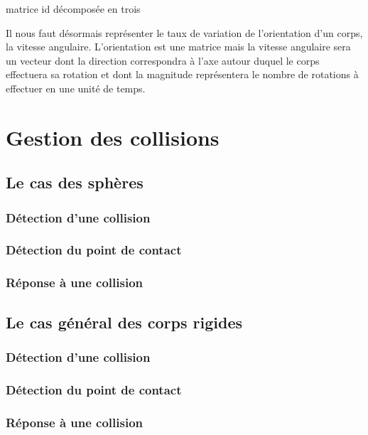 \documentclass[twocolumn]{article}
\begin{document}
matrice id décomposée en trois

Il nous faut désormais représenter le taux de variation de l'orientation d'un corps, la vitesse angulaire. L'orientation est une matrice mais la vitesse angulaire sera un vecteur dont la direction correspondra à l'axe autour duquel le corps effectuera sa rotation et dont la magnitude représentera le nombre de rotations à effectuer en une unité de temps.


\section{Gestion des collisions}

\subsection{Le cas des sphères}

\subsubsection{Détection d'une collision}

\subsubsection{Détection du point de contact}

\subsubsection{Réponse à une collision}

\subsection{Le cas général des corps rigides}

\subsubsection{Détection d'une collision}

\subsubsection{Détection du point de contact}

\subsubsection{Réponse à une collision}
\end{document}
